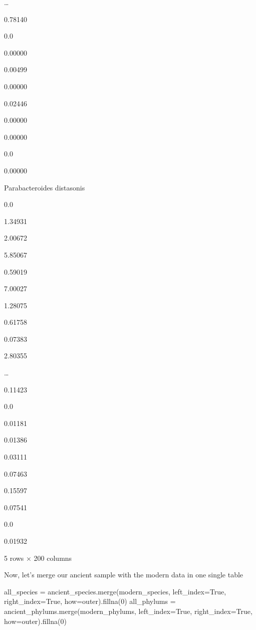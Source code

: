 \documentclass[
  letterpaper,
]{book}
\newenvironment{Shaded}{}{}
\newcommand{\DecValTok}[1]{\textcolor[rgb]{0.00,0.36,0.77}{#1}}
\newcommand{\NormalTok}[1]{\textcolor[rgb]{0.14,0.16,0.18}{#1}}
\newcommand{\OperatorTok}[1]{\textcolor[rgb]{0.14,0.16,0.18}{#1}}
\newcommand{\StringTok}[1]{\textcolor[rgb]{0.01,0.18,0.38}{#1}}
\newcommand{\VariableTok}[1]{\textcolor[rgb]{0.89,0.38,0.04}{#1}}
\begin{document}
\ldots{}

0.78140

0.0

0.00000

0.00499

0.00000

0.02446

0.00000

0.00000

0.0

0.00000

Parabacteroides distasonis

0.0

1.34931

2.00672

5.85067

0.59019

7.00027

1.28075

0.61758

0.07383

2.80355

\ldots{}

0.11423

0.0

0.01181

0.01386

0.03111

0.07463

0.15597

0.07541

0.0

0.01932

5 rows × 200 columns

Now, let's merge our ancient sample with the modern data in one single
table

\begin{Shaded}
\begin{Highlighting}[]
\NormalTok{all\_species }\OperatorTok{=}\NormalTok{ ancient\_species.merge(modern\_species, left\_index}\OperatorTok{=}\VariableTok{True}\NormalTok{, right\_index}\OperatorTok{=}\VariableTok{True}\NormalTok{, how}\OperatorTok{=}\StringTok{\textquotesingle{}outer\textquotesingle{}}\NormalTok{).fillna(}\DecValTok{0}\NormalTok{)}
\NormalTok{all\_phylums }\OperatorTok{=}\NormalTok{ ancient\_phylums.merge(modern\_phylums, left\_index}\OperatorTok{=}\VariableTok{True}\NormalTok{, right\_index}\OperatorTok{=}\VariableTok{True}\NormalTok{, how}\OperatorTok{=}\StringTok{\textquotesingle{}outer\textquotesingle{}}\NormalTok{).fillna(}\DecValTok{0}\NormalTok{)}
\end{Highlighting}
\end{Shaded}
\end{document}
